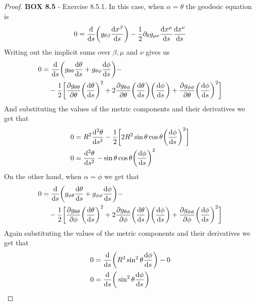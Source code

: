\documentclass[11pt]{article}
\theoremstyle{definition}
\begin{document}
\cleardoublepage
\begin{proof}{\textbf{BOX 8.5} - Exercise 8.5.1.}
    In this case, when $\alpha = \theta$ the geodesic equation is
    \begin{align*}
        0 = \derivative{}{s}\bigg(
        g_{\theta\beta}\derivative{x^\beta}{s}\bigg)
        - \frac{1}{2}\partial_\theta g_{\mu\nu}\derivative{x^\mu}{s}
        \derivative{x^\nu}{s}
    \end{align*}
    Writing out the implicit sums over $\beta, \mu$ and $\nu$ gives us
    \begin{align*}
        0 &= \derivative{}{s}\bigg(
            g_{\theta\theta}\derivative{\theta}{s}
            + g_{\theta\phi}\derivative{\phi}{s}
        \bigg) -\\
        &\quad- \frac{1}{2}\bigg[
            \partialderivative{g_{\theta\theta}}{\theta}
            \bigg(\derivative{\theta}{s}\bigg)^2
            + 2 \partialderivative{g_{\theta\phi}}{\theta}
            \bigg(\derivative{\theta}{s}\bigg)
            \bigg(\derivative{\phi}{s}\bigg)
            + \partialderivative{g_{\phi\phi}}{\theta}
            \bigg(\derivative{\phi}{s}\bigg)^2
        \bigg]
    \end{align*}
    And substituting the values of the metric components and their derivatives
    we get that
    \begin{align*}
        0 &= R^2\derivative[2]{\theta}{s} - \frac{1}{2}\bigg[
            2R^2\sin\theta\cos\theta
            \bigg(\derivative{\phi}{s}\bigg)^2
        \bigg]\\
        0 &= \derivative[2]{\theta}{s} -
            \sin\theta\cos\theta
            \bigg(\derivative{\phi}{s}\bigg)^2
    \end{align*}
    On the other hand, when $\alpha = \phi$ we get that
    \begin{align*}
        0 &= \derivative{}{s}\bigg(
            g_{\phi\theta}\derivative{\theta}{s}
            + g_{\phi\phi}\derivative{\phi}{s}
        \bigg) -\\
        &\quad- \frac{1}{2}\bigg[
            \partialderivative{g_{\theta\theta}}{\phi}
            \bigg(\derivative{\theta}{s}\bigg)^2
            + 2 \partialderivative{g_{\theta\phi}}{\phi}
            \bigg(\derivative{\theta}{s}\bigg)
            \bigg(\derivative{\phi}{s}\bigg)
            + \partialderivative{g_{\phi\phi}}{\phi}
            \bigg(\derivative{\phi}{s}\bigg)^2
        \bigg]
    \end{align*}
    Again substituting the values of the metric components and their
    derivatives we get that
    \begin{align*}
        0 &= \derivative{}{s}\bigg(R^2\sin^2\theta\derivative{\phi}{s}\bigg) - 0\\
        0 &= \derivative{}{s}\bigg(\sin^2\theta\derivative{\phi}{s}\bigg)
    \end{align*}
\end{proof}
\end{document}
